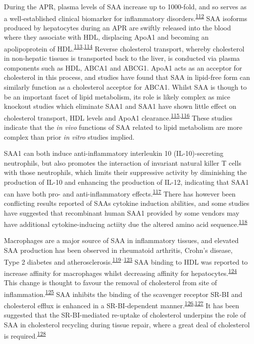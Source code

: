 \documentclass[
]{article}
\begin{document}
During the APR, plasma levels of SAA increase up to 1000-fold, and so serves as a well-established clinical biomarker for inflammatory disorders.\textsuperscript{\protect\hyperlink{ref-epstein_acute-phase_1999}{112}}
SAA isoforms produced by hepatocytes during an APR are swiftly released into the blood where they associate with HDL, displacing ApoA1 and becoming an apolipoprotein of HDL.\textsuperscript{\protect\hyperlink{ref-banka_serum_1995}{113},\protect\hyperlink{ref-benditt_amyloid_1977}{114}}
Reverse cholesterol transport, whereby cholesterol in non-hepatic tissues is transported back to the liver, is conducted via plasma components such as HDL, ABCA1 and ABCG1.
ApoA1 acts as an acceptor for cholesterol in this process, and studies have found that SAA in lipid-free form can similarly function as a cholesterol acceptor for ABCA1.
Whilst SAA is though to be an important facet of lipid metabolism, its role is likely complex as mice knockout studies which eliminate SAA1 and SAA1 have shown little effect on cholesterol transport, HDL levels and ApoA1 clearance.\textsuperscript{\protect\hyperlink{ref-de_beer_impact_2010}{115},\protect\hyperlink{ref-de_beer_atp_2011}{116}}
These studies indicate that the \emph{in vivo} functions of SAA related to lipid metabolism are more complex than prior \emph{in vitro} studies implied.

SAA1 can both induce anti-inflammatory interleukin 10 (IL-10)-secreting neutrophils, but also promotes the interaction of invariant natural killer T cells with those neutrophils, which limits their suppressive activity by diminishing the production of IL-10 and enhancing the production of IL-12, indicating that SAA1 can have both pro- and anti-inflammatory effects.\textsuperscript{\protect\hyperlink{ref-santo_invariant_2010}{117}}
There has however been conflicting results reported of SAAs cytokine induction abilities, and some studies have suggested that recombinant human SAA1 provided by some vendors may have additional cytokine-inducing actiity due the altered amino acid sequence.\textsuperscript{\protect\hyperlink{ref-kim_saa_2013}{118}}

Macrophages are a major source of SAA in inflammatory tissues, and elevated SAA production has been observed in rheumatoid arthritis, Crohn's disease, Type 2 diabetes and atherosclerosis.\textsuperscript{\protect\hyperlink{ref-marzi_acute-phase_2013}{119}--\protect\hyperlink{ref-meek_expression_1994}{123}}
SAA binding to HDL was reported to increase affinity for macrophages whilst decreasing affinity for hepatocytes.\textsuperscript{\protect\hyperlink{ref-kisilevsky_serum_1992}{124}}
This change is thought to favour the removal of cholesterol from site of inflammation.\textsuperscript{\protect\hyperlink{ref-kisilevsky_serum_1991}{125}}
SAA inhibits the binding of the scavenger receptor SR-BI and cholesterol efflux is enhanced in a SR-BI-dependent manner.\textsuperscript{\protect\hyperlink{ref-cai_serum_2005}{126},\protect\hyperlink{ref-van_der_westhuyzen_serum_2005}{127}}
It has been suggested that the SR-BI-mediated re-uptake of cholesterol underpins the role of SAA in cholesterol recycling during tissue repair, where a great deal of cholesterol is required.\textsuperscript{\protect\hyperlink{ref-kisilevsky_acute-phase_2012}{128}}
\end{document}
